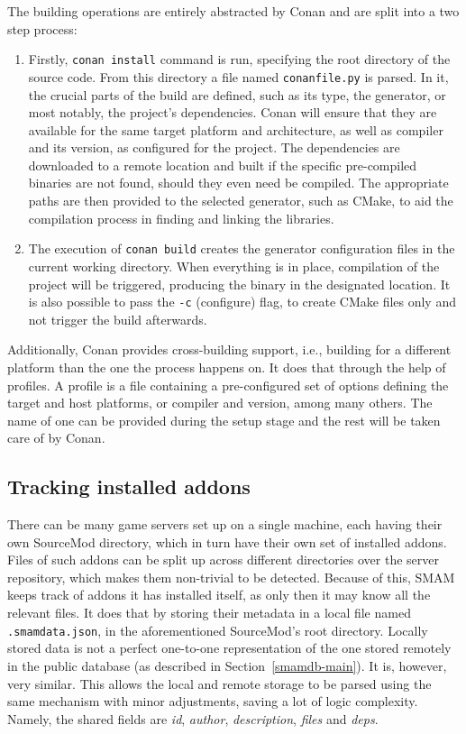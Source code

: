 The building operations are entirely abstracted by Conan and are split into a two step process:
\begin{enumerate}
\item
Firstly, \verb|conan install| command is run, specifying the root directory of the source code.
From this directory a file named \verb|conanfile.py| is parsed.
In it, the crucial parts of the build are defined, such as its type, the generator, or most notably, the project's dependencies.
Conan will ensure that they are available for the same target platform and architecture, as well as compiler and its version, as configured for the project.
The dependencies are downloaded to a remote location and built if the specific pre-compiled binaries are not found, should they even need be compiled.
The appropriate paths are then provided to the selected generator, such as CMake, to aid the compilation process in finding and linking the libraries.

\item
The execution of \verb|conan build| creates the generator configuration files in the current working directory.
When everything is in place, compilation of the project will be triggered, producing the binary in the designated location.
It is also possible to pass the \verb|-c| (configure) flag, to create CMake files only and not trigger the build afterwards.
\end{enumerate}

Additionally, Conan provides cross-building support, i.e., building for a different platform than the one the process happens on.
It does that through the help of profiles.
A profile is a file containing a pre-configured set of options defining the target and host platforms, or compiler and version, among many others.
The name of one can be provided during the setup stage and the rest will be taken care of by Conan.

\subsection{Tracking installed addons}
\label{tracking-addons}

There can be many game servers set up on a single machine, each having their own SourceMod directory, which in turn have their own set of installed addons.
Files of such addons can be split up across different directories over the server repository, which makes them non-trivial to be detected.
Because of this, SMAM keeps track of addons it has installed itself, as only then it may know all the relevant files.
It does that by storing their metadata in a local file named \verb|.smamdata.json|, in the aforementioned SourceMod's root directory.
Locally stored data is not a perfect one-to-one representation of the one stored remotely in the public database (as described in Section~\ref{smamdb-main}).
It is, however, very similar.
This allows the local and remote storage to be parsed using the same mechanism with minor adjustments, saving a lot of logic complexity.
Namely, the shared fields are \textit{id}, \textit{author}, \textit{description}, \textit{files} and \textit{deps}.

